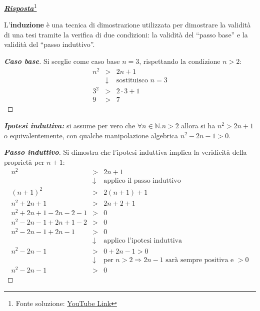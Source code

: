 \documentclass[a4paper]{article}
\newcommand{\dquotes}[1]{``#1''}
\begin{document}
	\noindent
	\textcolor{Green4}{\textbf{\emph{\underline{Risposta}}}}\footnote{Fonte soluzione: \href{https://youtu.be/2GycaLOF1no}{YouTube Link}}\newline
	
	\noindent
	L'\textbf{induzione} è una tecnica di dimostrazione utilizzata per dimostrare la validità di una tesi tramite la verifica di due condizioni: la validità del \dquotes{passo base} e la validità del \dquotes{passo induttivo}.
	
	\begin{proof}[\textbf{Caso base}]
		Si sceglie come caso base $n = 3$, rispettando la condizione $n > 2$:
		\begin{equation*}
			\begin{array}{rcl}
				n^{2} &>& 2n + 1 \\ [.3em]
				&\downarrow& \text{sostituisco }n=3 \\ [.3em]
				3^{2} &>& 2 \cdot 3 + 1 \\ [.3em]
				9 &>& 7
			\end{array}
		\end{equation*}
	\end{proof}
	
	\noindent
	\textbf{\emph{Ipotesi induttiva:}} si assume per vero che $\forall n \in \mathbb{N}.n>2$ allora si ha $n^{2} > 2n + 1$ o equivalentemente, con qualche manipolazione algebrica $n^{2} -2n -1 > 0$.
	
	\begin{proof}[\textbf{Passo induttivo}]
		Si dimostra che l'ipotesi induttiva implica la veridicità della proprietà per $n + 1$:
		\begin{equation*}
			\begin{array}{rcl}
				n^{2} &>& 2n + 1 \\ [.3em]
				&\downarrow& \text{applico il passo induttivo} \\ [.3em]
				\left(n+1\right)^{2} &>& 2 \left(n+1\right) + 1 \\ [.3em]
				n^{2} + 2n + 1 &>& 2n +2 +1 \\ [.3em]
				n^{2} + 2n + 1 -2n -2 -1 &>& 0 \\ [.3em]
				n^{2} -2n -1 + 2n + 1 -2 &>& 0 \\ [.3em]
				n^{2} -2n -1 + 2n -1 &>& 0 \\ [.3em]
				&\downarrow& \text{applico l'ipotesi induttiva} \\[.3em]
				n^{2} -2n -1 &>& 0 +2n -1 > 0 \\ [.3em]
				&\downarrow& \text{per } n > 2 \Rightarrow 2n-1 \text{ sarà sempre positiva e } >0 \\ [.3em]
				n^{2} -2n -1 &>& 0
			\end{array}
		\end{equation*}
	\end{proof}\newpage
	
\end{document}
